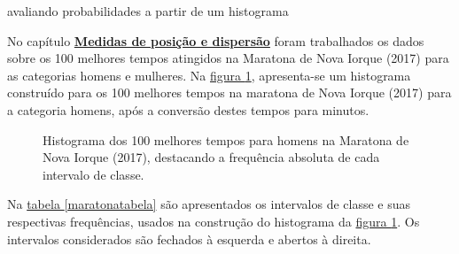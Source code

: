 \begin{task}{avaliando probabilidades a partir de um histograma}


No capítulo \hyperref[est2-chap]{\textbf{Medidas de posição e dispersão}} foram trabalhados os dados sobre os 100 melhores tempos atingidos na Maratona de Nova Iorque (2017) para as categorias homens e mulheres. Na \hyperref[maratona-homens-prob]{figura \ref{maratona-homens-prob}}, apresenta-se um histograma construído para os 100 melhores tempos na maratona de Nova Iorque (2017) para a categoria homens, após a conversão destes tempos para minutos.

\begin{figure}[H]
\centering

\caption{Histograma dos 100 melhores tempos para homens na Maratona de Nova Iorque (2017), destacando a frequência absoluta de cada intervalo de classe.}
\label{maratona-homens-prob}
\end{figure}


Na \hyperref[maratonatabela]{
tabela \ref{maratonatabela}} são apresentados os intervalos de classe e suas respectivas frequências, usados na construção do histograma da \hyperref[maratona-homens-prob]{figura \ref{maratona-homens-prob}}. Os intervalos considerados são fechados à esquerda e abertos à direita.


\end{task}
